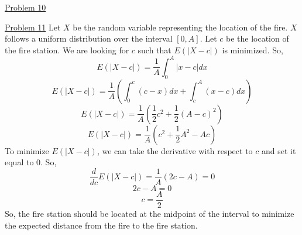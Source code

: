 \documentclass{exam}
\begin{document}
\underline{Problem 10}
\newline
{}

\underline{Problem 11}
\newline
\newline
Let $X$ be the random variable representing the location of the fire. $X$ follows a uniform distribution over the interval $[0,A]$. Let $c$ be the location of the fire station. We are looking for $c$ such that $E(|X-c|)$ is minimized. So,
\[E(|X-c|) = \frac{1}{A}\int_{0}^{A}|x-c|dx\]
\[E(|X-c|) = \frac{1}{A}\left(\int_{0}^{c}(c-x)dx+\int_{c}^{A}(x-c)dx\right)\]
\[E(|X-c|) = \frac{1}{A}\left(\frac{1}{2}c^2+\frac{1}{2}(A-c)^2\right)\]
\[E(|X-c|) = \frac{1}{A}\left(c^2+\frac{1}{2}A^2-Ac\right)\]
To minimize $E(|X-c|)$, we can take the derivative with respect to $c$ and set it equal to 0. So,
\[\frac{d}{dc}E(|X-c|) = \frac{1}{A}(2c-A) = 0\]
\[2c-A=0\]
\[c=\frac{A}{2}\]
So, the fire station should be located at the midpoint of the interval to minimize the expected distance from the fire to the fire station.
\newline
\end{document}
